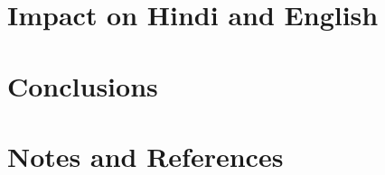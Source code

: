 \documentclass{article}
\begin{document}
\section{Impact on Hindi and English}


\section{Conclusions}

\section{Notes and References}
\end{document}
